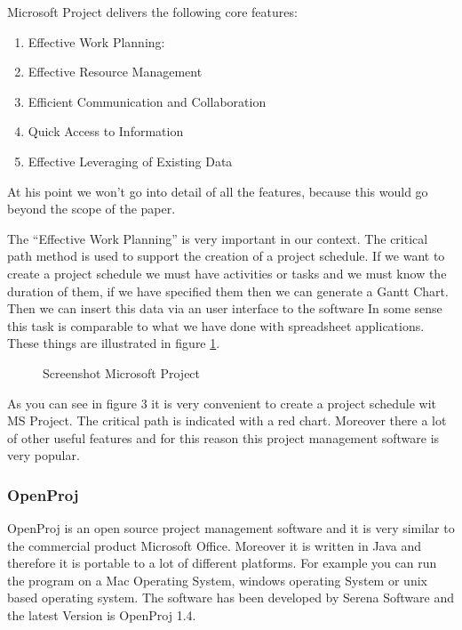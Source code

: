 Microsoft Project delivers the following core features:
\begin{enumerate}
\item Effective Work Planning:
\item Effective Resource Management
\item Efficient Communication and Collaboration
\item Quick Access to Information
\item Effective Leveraging of Existing Data
\end{enumerate}

At his point we won't go into detail of all the features, because this would go beyond the scope of the paper.

The “Effective Work Planning” is very important in our context. The critical path method is used to support the creation of a project schedule. 
If we want to create a project schedule we must have activities or tasks and we must know the duration of them, if we have specified them then we can generate a Gantt Chart. Then we can insert this data via an user interface to the software In some sense this task is comparable to what we have done with spreadsheet applications. These things are illustrated in figure \ref{pic:msproject}.

\begin{figure}[h!!] 
\centerline{}
\caption{Screenshot Microsoft Project}
\label{pic:msproject}
\end{figure}

As you can see in figure 3 it is very convenient to create a project schedule wit MS Project. The critical path is indicated with a red chart. Moreover there a lot of other useful features and for this reason this project management software is very popular.

\subsubsection{OpenProj}
OpenProj is an open source project management software and it is very similar to the commercial product Microsoft Office. Moreover it is written in Java and therefore it is portable to a lot of different platforms. For example you can run the program on a Mac Operating System, windows operating System or unix based operating system.
The software has been developed by Serena Software and the latest Version is OpenProj 1.4.


